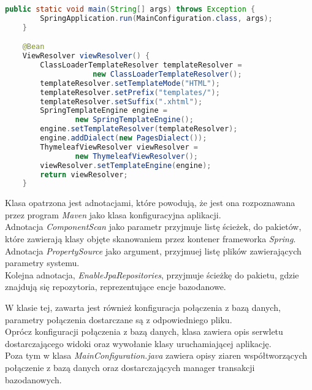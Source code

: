 \documentclass[a4paper, titlepage]{article}
\begin{document}
\begin{lstlisting}[language = JAVA, label=some-code,caption=Plik MainConfiguration.java, linewidth=15.4cm]
    public static void main(String[] args) throws Exception {
        SpringApplication.run(MainConfiguration.class, args);
    }

    @Bean
    ViewResolver viewResolver() {
        ClassLoaderTemplateResolver templateResolver =
        			new ClassLoaderTemplateResolver();
        templateResolver.setTemplateMode("HTML");
        templateResolver.setPrefix("templates/");
        templateResolver.setSuffix(".xhtml");
        SpringTemplateEngine engine = 
        		new SpringTemplateEngine();
        engine.setTemplateResolver(templateResolver);
        engine.addDialect(new PagesDialect());
        ThymeleafViewResolver viewResolver =
        		new ThymeleafViewResolver();
        viewResolver.setTemplateEngine(engine);
        return viewResolver;
    }
\end{lstlisting}

Klasa opatrzona jest adnotacjami, które powodują, że jest ona rozpoznawana przez program \textit{Maven} jako klasa konfiguracyjna aplikacji.
\\Adnotacja \textit{ComponentScan} jako parametr przyjmuje listę ścieżek, do pakietów, które zawierają klasy objęte skanowaniem przez kontener frameworka \textit{Spring}.
\\Adnotacja \textit{PropertySource} jako argument, przyjmuej listę plików zawierających parametry systemu.
\\Kolejna adnotacja, \textit{EnableJpaRepositories}, przyjmuje ścieżkę do pakietu, gdzie znajdują się repozytoria, reprezentujące encje bazodanowe.

W klasie tej, zawarta jest również konfiguracja połączenia z bazą danych, parametry połączenia dostarczane są z odpowiedniego pliku.
\\Oprócz konfiguracji połączenia z bazą danych, klasa zawiera opis serwletu dostarczającego widoki oraz wywołanie klasy uruchamiającej aplikację.
\\Poza tym w klasa \textit{MainConfiguration.java} zawiera opisy ziaren współtworzących połączenie z bazą danych oraz dostarczających manager transakcji bazodanowych.
\end{document}
